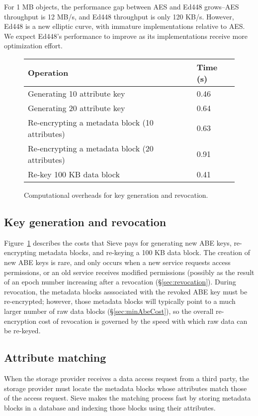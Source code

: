 For 1 MB objects, the performance gap between
AES and Ed448 grows--AES throughput is 12 MB/s,
and Ed448 throughput is only 120 KB/s. However,
Ed448 is a new elliptic curve, with immature
implementations relative to AES. We expect
Ed448's performance to improve as its
implementations receive more optimization
effort.
\begin{figure}
\centering
\begin{tabular}{ |p{5.5cm}|p{1.5cm}| }
\hline
Operation & Time (s)\\ \hline
Generating 10 attribute key &  0.46\\ \hline
Generating 20 attribute key & 0.64\\ \hline
Re-encrypting a metadata block (10 attributes) & 0.63 \\ \hline
Re-encrypting a metadata block (20 attributes) & 0.91 \\ \hline
Re-key 100 KB data block & 0.41 \\ \hline
\end{tabular}
\caption{Computational overheads for key generation and revocation.}
\label{fig:sievekey}
\end{figure}

\subsection{Key generation and revocation}
Figure~\ref{fig:sievekey} describes the costs
that Sieve pays for generating new ABE keys,
re-encrypting metadata blocks, and re-keying
a 100 KB data block. The creation of new ABE
keys is rare, and only occurs when a new service
requests access permissions, or an old service
receives modified permissions (possibly as the
result of an epoch number increasing after a
revocation (\S\ref{sec:revocation}). During
revocation, the metadata blocks asssociated
with the revoked ABE key must be re-encrypted;
however, those metadata blocks will typically
point to a much larger number of raw data
blocks (\S\ref{sec:minAbeCost}), so the overall
re-encryption cost of revocation is governed
by the speed with which raw data can be re-keyed.

\subsection{Attribute matching} 
When the storage
provider receives a data access request from a
third party, the storage provider must locate
the metadata blocks whose attributes match those
of the access request. Sieve makes the matching
process fast by storing metadata blocks in a
database and indexing those blocks using their
attributes.

